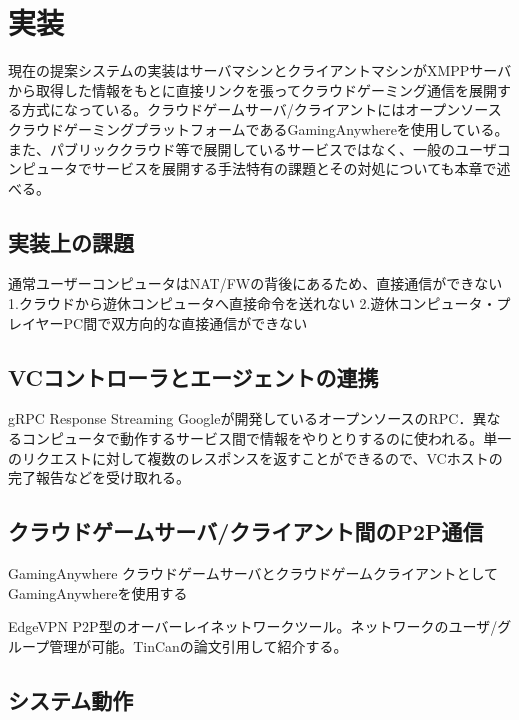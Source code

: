 \section{実装}

現在の提案システムの実装はサーバマシンとクライアントマシンがXMPPサーバから取得した情報をもとに直接リンクを張ってクラウドゲーミング通信を展開する方式になっている。クラウドゲームサーバ/クライアントにはオープンソースクラウドゲーミングプラットフォームであるGamingAnywhereを使用している。また、パブリッククラウド等で展開しているサービスではなく、一般のユーザコンピュータでサービスを展開する手法特有の課題とその対処についても本章で述べる。

\subsection{実装上の課題}
通常ユーザーコンピュータはNAT/FWの背後にあるため、直接通信ができない
1.クラウドから遊休コンピュータへ直接命令を送れない
2.遊休コンピュータ・プレイヤーPC間で双方向的な直接通信ができない


\subsection{VCコントローラとエージェントの連携}
gRPC Response Streaming
Googleが開発しているオープンソースのRPC．異なるコンピュータで動作するサービス間で情報をやりとりするのに使われる。単一のリクエストに対して複数のレスポンスを返すことができるので、VCホストの完了報告などを受け取れる。

\subsection{クラウドゲームサーバ/クライアント間のP2P通信}

GamingAnywhere
クラウドゲームサーバとクラウドゲームクライアントとしてGamingAnywhereを使用する

EdgeVPN
P2P型のオーバーレイネットワークツール。ネットワークのユーザ/グループ管理が可能。TinCanの論文引用して紹介する。

\subsection{システム動作}

